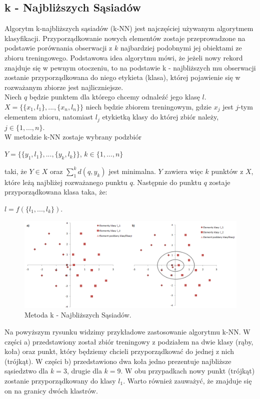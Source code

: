 \documentclass[12pt,a4paper]{report}
\begin{document}
\subsection{k - Najbliższych Sąsiadów}%
Algorytm k-najbliższych sąsiadów (k-NN) jest najczęściej używanym algorytmem klasyfikacji. 
Przyporządkowanie nowych elementów zostaje przeprowadzone na podstawie porównania obserwacji z $k$ najbardziej podobnymi jej obiektami ze zbioru treningowego. Podstawowa idea algorytmu mówi, że jeżeli nowy rekord znajduje się w pewnym otoczeniu, to na podstawie k - najbliższych mu obserwacji zostanie przyporządkowana do niego etykieta (klasa), której pojawienie się w rozważanym zbiorze jest najliczniejsze.
\\Niech $q$ będzie punktem dla którego chcemy odnaleźć jego klasę $l$. 
\\$X=\{\{x_1,l_1\},...,\{x_n,l_n\}\}$ niech będzie zbiorem treningowym, gdzie $x_j$ jest $j$-tym elementem zbioru, natomiast $l_j$ etykietką klasy do której zbiór należy, $j\in\{1,...,n\}$.
\\W metodzie k-NN zostaje wybrany podzbiór 
\begin{center}
$Y=\{\{y_1,l_1\},...,\{y_k,l_k\}\}$, $k\in\{1,...,n\}$
\end{center}
taki, że $Y \in X$ oraz $\sum_1^k d(q,y_k)$ jest minimalna. $Y$ zawiera więc $k$ punktów z $X$, które leżą najbliżej rozważanego punktu $q$. Następnie do punktu $q$ zostaje przyporządkowana klasa taka, że:
\begin{center}
$l=f(\{l_1,...,l_k\})$.
\end{center}
\begin{figure}[H]
\centering
\includegraphics[scale=0.5]{kNN.PNG} 
\caption{Metoda k - Najbliższych Sąsiadów.}
\end{figure}
\bigskip
Na powyższym rysunku widzimy przykładowe zastosowanie algorytmu k-NN. W części a) przedstawiony został zbiór treningowy z podziałem na dwie klasy (rąby, koła) oraz punkt, który będziemy chcieli przyporządkować do jednej z nich (trójkąt). W części b) przedstawiono dwa koła jedno prezentuje najbliższe sąsiedztwo dla $k = 3$, drugie dla $k = 9$. W obu przypadkach nowy punkt (trójkąt) zostanie przyporządkowany do klasy $l_1$. Warto również zauważyć, że znajduje się on na granicy dwóch klastrów.
\end{document}
